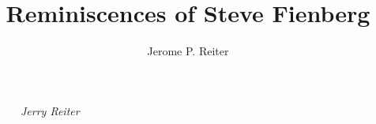 \documentclass[final]{jpcfinal} %
\begin{document}
\title[Reminiscences]{Reminiscences of Steve Fienberg}

\author{Jerome P. Reiter}	%
\address{Department of Statistical Science, Duke University}	%

\maketitle
%
%
\begin{figure}[H]
	\begin{cornerbox}[width=\linewidth]\small{}\selectfont
		
		
		
		\hfill \it Jerry Reiter
	\end{cornerbox}
\end{figure}





%
\end{document}
